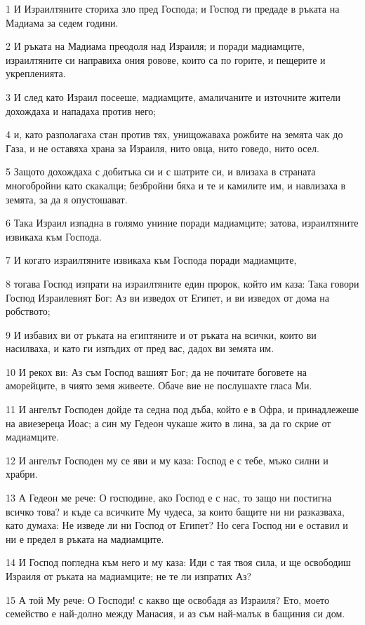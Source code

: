 \par 1 И Израилтяните сториха зло пред Господа; и Господ ги предаде в ръката на Мадиама за седем години.
\par 2 И ръката на Мадиама преодоля над Израиля; и поради мадиамците, израилтяните си направиха ония ровове, които са по горите, и пещерите и укрепленията.
\par 3 И след като Израил посееше, мадиамците, амаличаните и източните жители дохождаха и нападаха против него;
\par 4 и, като разполагаха стан против тях, унищожаваха рожбите на земята чак до Газа, и не оставяха храна за Израиля, нито овца, нито говедо, нито осел.
\par 5 Защото дохождаха с добитъка си и с шатрите си, и влизаха в страната многобройни като скакалци; безбройни бяха и те и камилите им, и навлизаха в земята, за да я опустошават.
\par 6 Така Израил изпадна в голямо униние поради мадиамците; затова, израилтяните извикаха към Господа.
\par 7 И когато израилтяните извикаха към Господа поради мадиамците,
\par 8 тогава Господ изпрати на израилтяните един пророк, който им каза: Така говори Господ Израилевият Бог: Аз ви изведох от Египет, и ви изведох от дома на робството;
\par 9 И избавих ви от ръката на египтяните и от ръката на всички, които ви насилваха, и като ги изпъдих от пред вас, дадох ви земята им.
\par 10 И рекох ви: Аз съм Господ вашият Бог; да не почитате боговете на аморейците, в чиято земя живеете. Обаче вие не послушахте гласа Ми.
\par 11 И ангелът Господен дойде та седна под дъба, който е в Офра, и принадлежеше на авиезереца Иоас; а син му Гедеон чукаше жито в лина, за да го скрие от мадиамците.
\par 12 И ангелът Господен му се яви и му каза: Господ е с тебе, мъжо силни и храбри.
\par 13 А Гедеон ме рече: О господине, ако Господ е с нас, то защо ни постигна всичко това? и къде са всичките Му чудеса, за които бащите ни ни разказваха, като думаха: Не изведе ли ни Господ от Египет? Но сега Господ ни е оставил и ни е предел в ръката на мадиамците.
\par 14 И Господ погледна към него и му каза: Иди с тая твоя сила, и ще освободиш Израиля от ръката на мадиамците; не те ли изпратих Аз?
\par 15 А той Му рече: О Господи! с какво ще освобадя аз Израиля? Ето, моето семейство е най-долно между Манасия, и аз съм най-малък в бащиния си дом.
